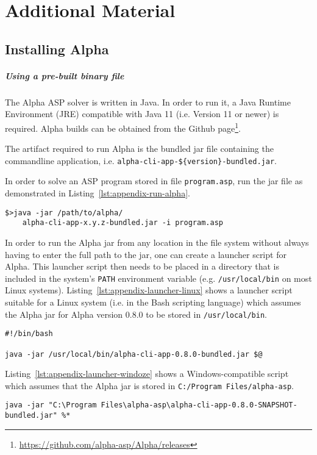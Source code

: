 \chapter{Additional Material}

\section{Installing Alpha}

\paragraph{Using a pre-built binary file}
The Alpha ASP solver is written in Java. In order to run it, a Java Runtime Environment (JRE) compatible with Java 11 (i.e. Version 11 or newer) is required. Alpha builds can be obtained from the Github page\footnote{\url{https://github.com/alpha-asp/Alpha/releases}}.

The artifact required to run Alpha is the bundled jar file containing the commandline application, i.e. \texttt{alpha-cli-app-\$\{version\}-bundled.jar}.

In order to solve an ASP program stored in file \texttt{program.asp}, run the jar file as demonstrated in Listing~\ref{lst:appendix-run-alpha}.
\begin{lstlisting}[style=code, label={lst:appendix-run-alpha}, caption={Solving an ASP program using Alpha.}]
$>java -jar /path/to/alpha/
	alpha-cli-app-x.y.z-bundled.jar -i program.asp
\end{lstlisting}	

In order to run the Alpha jar from any location in the file system without always having to enter the full path to the jar, one can create a launcher script for Alpha. This launcher script then needs to be placed in a directory that is included in the system's \texttt{PATH} environment variable (e.g. \texttt{/usr/local/bin} on most Linux systems). Listing~\ref{lst:appendix-launcher-linux} shows a launcher script suitable for a Linux system (i.e. in the Bash scripting language) which assumes the Alpha jar for Alpha version 0.8.0 to be stored in \texttt{/usr/local/bin}.
\begin{lstlisting}[style=asp-code, label={lst:appendix-launcher-linux}, caption={Bash launcher script for Alpha.}]
#!/bin/bash

java -jar /usr/local/bin/alpha-cli-app-0.8.0-bundled.jar $@
\end{lstlisting}	

Listing~\ref{lst:appendix-launcher-windoze} shows a Windows-compatible script which assumes that the Alpha jar is stored in \texttt{C:/Program Files/alpha-asp}.
\begin{lstlisting}[style=asp-code, label={lst:appendix-launcher-windoze}, caption={Windows-Batch launcher script for Alpha.}]
java -jar "C:\Program Files\alpha-asp\alpha-cli-app-0.8.0-SNAPSHOT-bundled.jar" %*
\end{lstlisting}	


